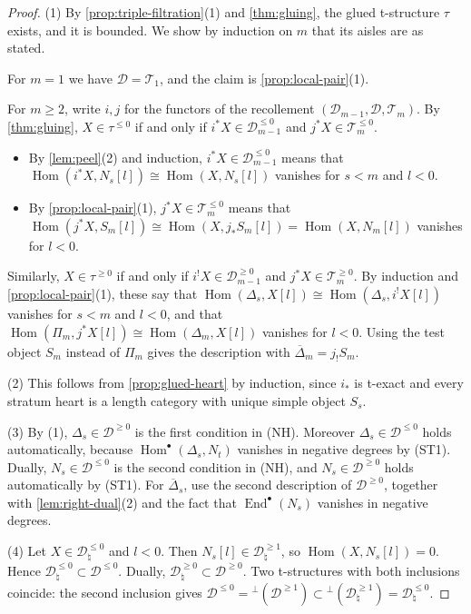 \documentclass[11pt,reqno]{amsart}
\theoremstyle{plain}
\theoremstyle{definition}
\theoremstyle{remark}
\DeclareMathOperator{\Hom}{Hom}
\DeclareMathOperator{\End}{End}
\newcommand{\Deltabar}{\overline{\Delta}}
\newcommand{\cD}{\mathcal{D}}
\newcommand{\cT}{\mathcal{T}}
\begin{document}
\begin{proof}
(1) By \cref{prop:triple-filtration}(1) and \cref{thm:gluing}, the glued t-structure $\tau$ exists, and it is bounded. We show by induction on $m$ that its aisles are as stated.

For $m=1$ we have $\cD=\cT_1$, and the claim is \cref{prop:local-pair}(1).

For $m\ge2$, write $i,j$ for the functors of the recollement $(\cD_{m-1},\cD,\cT_m)$. By \cref{thm:gluing}, $X\in\tau^{\le0}$ if and only if $i^*X\in\cD_{m-1}^{\le0}$ and $j^*X\in\cT_m^{\le0}$.
\begin{itemize}
\item By \cref{lem:peel}(2) and induction, $i^*X\in\cD_{m-1}^{\le0}$ means that $\Hom(i^*X,N_s[l])\cong\Hom(X,N_s[l])$ vanishes for $s<m$ and $l<0$.
\item By \cref{prop:local-pair}(1), $j^*X\in\cT_m^{\le0}$ means that $\Hom(j^*X,S_m[l])\cong\Hom(X,j_*S_m[l])=\Hom(X,N_m[l])$ vanishes for $l<0$.
\end{itemize}
Similarly, $X\in\tau^{\ge0}$ if and only if $i^!X\in\cD_{m-1}^{\ge0}$ and $j^*X\in\cT_m^{\ge0}$. By induction and \cref{prop:local-pair}(1), these say that $\Hom(\Delta_s,X[l])\cong\Hom(\Delta_s,i^!X[l])$ vanishes for $s<m$ and $l<0$, and that $\Hom(\Pi_m,j^*X[l])\cong\Hom(\Delta_m,X[l])$ vanishes for $l<0$. Using the test object $S_m$ instead of $\Pi_m$ gives the description with $\Deltabar_m=j_!S_m$.

(2) This follows from \cref{prop:glued-heart} by induction, since $i_*$ is t-exact and every stratum heart is a length category with unique simple object $S_s$.

(3) By (1), $\Delta_s\in\cD^{\ge0}$ is the first condition in (NH). Moreover $\Delta_s\in\cD^{\le0}$ holds automatically, because $\Hom^\bullet(\Delta_s,N_t)$ vanishes in negative degrees by (ST1). Dually, $N_s\in\cD^{\le0}$ is the second condition in (NH), and $N_s\in\cD^{\ge0}$ holds automatically by (ST1). For $\Deltabar_s$, use the second description of $\cD^{\ge0}$, together with \cref{lem:right-dual}(2) and the fact that $\End^\bullet(N_s)$ vanishes in negative degrees.

(4) Let $X\in\cD_\natural^{\le0}$ and $l<0$. Then $N_s[l]\in\cD_\natural^{\ge1}$, so $\Hom(X,N_s[l])=0$. Hence $\cD_\natural^{\le0}\subset\cD^{\le0}$. Dually, $\cD_\natural^{\ge0}\subset\cD^{\ge0}$. Two t-structures with both inclusions coincide: the second inclusion gives $\cD^{\le0}={}^\perp(\cD^{\ge1})\subset{}^\perp(\cD_\natural^{\ge1})=\cD_\natural^{\le0}$.
\end{proof}
\end{document}
